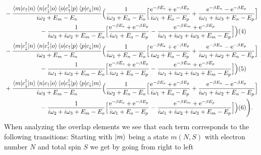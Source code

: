 \documentclass[12pt,a4paper]{scrartcl}
\numberwithin{equation}{section}
\renewcommand{\exp}[1]{\mathrm{e}^{#1}}
\begin{document}
\begin{align}
     &-
 \frac{\braket{m|c_{\uparrow} |n}\braket{n|c^{\dagger}_{\downarrow} |o}\braket{o|c^{\dagger}_{\uparrow} |p}\braket{p| c_{\downarrow} |m}}{i\omega_2 +E_m-E_n}
 \Big( \frac{1}{i\omega_3 +E_n-E_o}
 \Big[
 \frac{\exp{-\beta E_o}+\exp{-\beta E_p} }{i\omega_1 +E_o-E_p} 
  + \frac{ \exp{-\beta E_n} - \exp{-\beta E_p} }{ i\omega_1 + i\omega_3 + E_n- E_p } 
 \Big] \nonumber \\
 & \hspace*{2cm} -  \frac{1}{i\omega_3+ i\omega_2 + E_m-E_o}
 \Big[
  \frac{\exp{-\beta E_o}+\exp{-\beta E_p} }{i\omega_1 +E_o-E_p} 
 -  \frac{ \exp{-\beta E_m}+\exp{-\beta E_p} }{ i\omega_1 + i\omega_2 + i\omega_3 + E_m- E_p } 
 \Big]
 \Big) (4) \nonumber\\
     &-
 \frac{\braket{m|c^{\dagger}_{\downarrow} |n}\braket{n|c^{\dagger}_{\uparrow} |o}\braket{o|c_{\uparrow} |p}\braket{p|c_{\downarrow} |m} }{i\omega_3 +E_m-E_n}
 \Big( \frac{1}{i\omega_1 +E_n-E_o}
 \Big[
 \frac{\exp{-\beta E_o}+\exp{-\beta E_p} }{i\omega_2 +E_o-E_p} 
  + \frac{ \exp{-\beta E_n} - \exp{-\beta E_p} }{ i\omega_1 + i\omega_2 + E_n- E_p } 
 \Big] \nonumber \\
 & \hspace*{2cm} -  \frac{1}{i\omega_1+ i\omega_3 + E_m-E_o}
 \Big[
  \frac{\exp{-\beta E_o}+\exp{-\beta E_p} }{i\omega_2 +E_o-E_p} 
 -  \frac{ \exp{-\beta E_m}+\exp{-\beta E_p} }{ i\omega_1 + i\omega_2 + i\omega_3 + E_m- E_p } 
 \Big]
 \Big) (5) \nonumber\\
     &+
 \frac{\braket{m|c^{\dagger}_{\downarrow} |n}\braket{n|c_{\uparrow} |o}\braket{o|c^{\dagger}_{\uparrow} |p}\braket{p| c_{\downarrow} |m}}{i\omega_3 +E_m-E_n}
 \Big( \frac{1}{i\omega_2 +E_n-E_o}
 \Big[
 \frac{\exp{-\beta E_o}+\exp{-\beta E_p} }{i\omega_1 +E_o-E_p} 
  + \frac{ \exp{-\beta E_n} - \exp{-\beta E_p} }{ i\omega_1 + i\omega_2 + E_n- E_p } 
 \Big] \nonumber \\
 & \hspace*{2cm} -  \frac{1}{i\omega_2+ i\omega_3 + E_m-E_o}
 \Big[
  \frac{\exp{-\beta E_o}+\exp{-\beta E_p} }{i\omega_1 +E_o-E_p} 
 -  \frac{ \exp{-\beta E_m}+\exp{-\beta E_p} }{ i\omega_1 + i\omega_2 + i\omega_3 + E_m- E_p } 
 \Big]
 \Big) (6) \Bigg) \nonumber .
\end{align}
When analyzing the overlap elements we see that each term corresponds to the following transitions: Starting with $\ket{m}$
being a state $m(N,S)$ with electron number $N$ and total spin $S$ we get  by going from right to left
\end{document}
